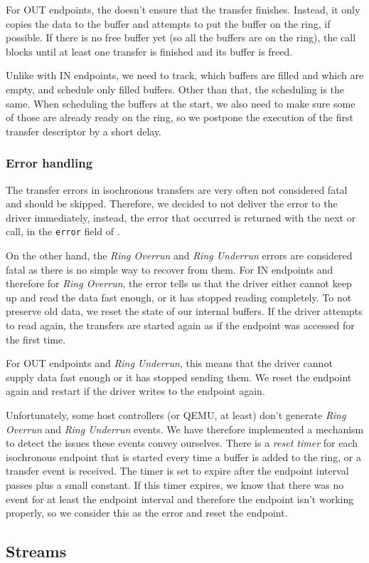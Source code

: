 For OUT endpoints, the  doesn't ensure that the transfer
finishes. Instead, it only copies the data to the buffer and attempts to put
the buffer on the ring, if possible. If there is no free buffer yet (so all the
buffers are on the ring), the call blocks until at least one transfer is
finished and its buffer is freed.

Unlike with IN endpoints, we need to track, which buffers are filled and which
are empty, and schedule only filled buffers. Other than that, the scheduling is
the same. When scheduling the buffers at the start, we also need to make sure
some of those are already ready on the ring, so we postpone the execution of
the first transfer descriptor by a short delay.

\subsubsection{Error handling}

The transfer errors in isochronous transfers are very often not considered fatal
and should be skipped. Therefore, we decided to not deliver the
error to the driver immediately, instead, the error that occurred is returned with
the next  or  call, in the \texttt{error} field of
.

On the other hand, the \textit{Ring Overrun} and \textit{Ring Underrun} errors
are considered fatal as there is no simple way to recover from them. For IN
endpoints and therefore for \textit{Ring Overrun}, the error tells us that the
driver either cannot keep up and read the data fast enough, or it has stopped
reading completely. To not preserve old data, we reset the state of our
internal buffers. If the driver attempts to read again, the transfers are
started again as if the endpoint was accessed for the first time.

For OUT endpoints and \textit{Ring Underrun}, this means that the driver cannot
supply data fast enough or it has stopped sending them. We reset the endpoint
again and restart if the driver writes to the endpoint again.

Unfortunately, some host controllers (or QEMU, at least) don't generate
\textit{Ring Overrun} and \textit{Ring Underrun} events. We have therefore
implemented a mechanism to detect the issues these events convey ourselves.
There is a \textit{reset timer} for each isochronous endpoint that is started
every time a buffer is added to the ring, or a transfer event is received. The
timer is set to expire after the endpoint interval passes plus a small
constant. If this timer expires, we know that there was no event for at least
the endpoint interval and therefore the endpoint isn't working properly, so we
consider this as the error and reset the endpoint.

\subsection{Streams}

